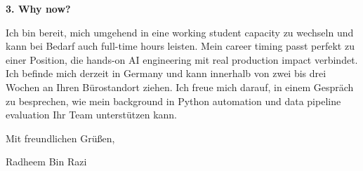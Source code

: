 \documentclass[11pt,a4paper]{coverletter}
\begin{document}
\vspace{8pt}\noindent\textbf{3. Why now?}\par\vspace{3pt}

Ich bin bereit, mich umgehend in eine working student capacity zu wechseln und kann bei Bedarf auch full-time hours leisten. Mein career timing passt perfekt zu einer Position, die hands-on AI engineering mit real production impact verbindet. Ich befinde mich derzeit in Germany und kann innerhalb von zwei bis drei Wochen an Ihren Bürostandort ziehen. Ich freue mich darauf, in einem Gespräch zu besprechen, wie mein background in Python automation und data pipeline evaluation Ihr Team unterstützen kann.

\closing{Mit freundlichen Grüßen,}{Radheem Bin Razi}
\end{document}
